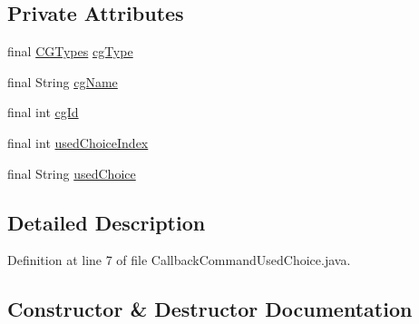 \subsection*{Private Attributes}
\begin{DoxyCompactItemize}
\item 
final \hyperlink{enumgov_1_1nasa_1_1jpf_1_1inspector_1_1interfaces_1_1_choice_generators_interface_1_1_c_g_types}{C\+G\+Types} \hyperlink{classgov_1_1nasa_1_1jpf_1_1inspector_1_1server_1_1callbacks_1_1commands_1_1_callback_command_used_choice_ab877d50d24ec11ffd927d41032e7ce13}{cg\+Type}
\item 
final String \hyperlink{classgov_1_1nasa_1_1jpf_1_1inspector_1_1server_1_1callbacks_1_1commands_1_1_callback_command_used_choice_a09c25148cbdd2ccaf30eb0a53667be92}{cg\+Name}
\item 
final int \hyperlink{classgov_1_1nasa_1_1jpf_1_1inspector_1_1server_1_1callbacks_1_1commands_1_1_callback_command_used_choice_a04c9b7cfbd7d587dd988c6240bf9626f}{cg\+Id}
\item 
final int \hyperlink{classgov_1_1nasa_1_1jpf_1_1inspector_1_1server_1_1callbacks_1_1commands_1_1_callback_command_used_choice_ab3fd7e97cf146c916bdaf5758c52ae9c}{used\+Choice\+Index}
\item 
final String \hyperlink{classgov_1_1nasa_1_1jpf_1_1inspector_1_1server_1_1callbacks_1_1commands_1_1_callback_command_used_choice_a391fd3bca9375bce374e2535cb7c8d62}{used\+Choice}
\end{DoxyCompactItemize}


\subsection{Detailed Description}


Definition at line 7 of file Callback\+Command\+Used\+Choice.\+java.



\subsection{Constructor \& Destructor Documentation}
